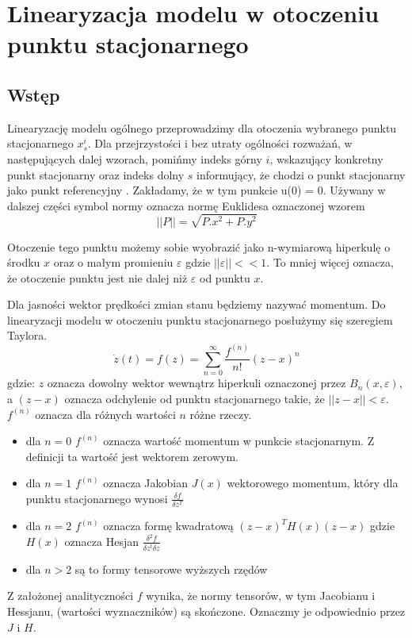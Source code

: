 \documentclass{article}
\begin{document}
	\maketitle
	\section{Linearyzacja modelu w otoczeniu punktu stacjonarnego}
	\subsection{Wstęp}
		Linearyzację modelu ogólnego przeprowadzimy dla otoczenia wybranego punktu
		stacjonarnego $x_s^i$. Dla przejrzystości i bez utraty ogólności rozważań, w następujących
		dalej wzorach, pomińmy indeks górny $i$, wskazujący konkretny punkt stacjonarny oraz
		indeks dolny $s$ informujący, że chodzi o punkt stacjonarny jako punkt referencyjny .
		Zakładamy, że w tym punkcie u(0) = 0. Używany w dalszej części symbol normy oznacza
		normę Euklidesa oznaczonej wzorem
		\begin{equation}
			||P|| = \sqrt{P.x^2 + P.y^2}
		\end{equation}

		Otoczenie tego punktu możemy sobie wyobrazić jako n-wymiarową hiperkulę o środku $x$
		oraz o małym promieniu $\varepsilon$ gdzie $||\varepsilon|| << 1$.
		To mniej więcej oznacza, że otoczenie punktu jest nie dalej niż $\varepsilon$ od punktu $x$.
		
		Dla jasności wektor prędkości zmian stanu będziemy nazywać momentum.
		Do linearyzacji modelu w otoczeniu punktu stacjonarnego posłużymy się szeregiem Taylora.
		\begin{equation}
			\dot{z}(t) = f(z) = \sum_{n=0}^{\infty}\frac{f^{(n)}}{n!}(z-x)^n
		\end{equation}
		gdzie: $z$ oznacza dowolny wektor wewnątrz hiperkuli oznaczonej przez $B_n(x, \varepsilon)$, a 
		$(z-x)$ oznacza odchylenie od punktu stacjonarnego takie, że $||z-x||<\varepsilon$.
		$f^{(n)}$ oznacza dla różnych wartości $n$ różne rzeczy.
		\begin{itemize}
			\item dla $n=0$ $f^{(n)}$ oznacza wartość momentum w punkcie stacjonarnym.
				Z definicji ta wartość jest wektorem zerowym.
			\item dla $n=1$ $f^{(n)}$ oznacza Jakobian $J(x)$ wektorowego momentum, który dla 
				punktu stacjonarnego wynosi $\frac{\delta f}{\delta z^T}$
			\item dla $n=2$ $f^{(n)}$ oznacza formę kwadratową $(z-x)^TH(x)(z-x)$
				gdzie $H(x)$ oznacza Hesjan $\frac{\delta^2f}{\delta z^t \delta z}$
			\item dla $n>2$ są to formy tensorowe wyższych rzędów
		\end{itemize}
		Z założonej analityczności
		$f$ wynika, że normy tensorów, w tym Jacobianu i Hessjanu, 
		(wartości wyznaczników) są skończone. Oznaczmy je odpowiednio przez $J$ i $H$.
\end{document}
